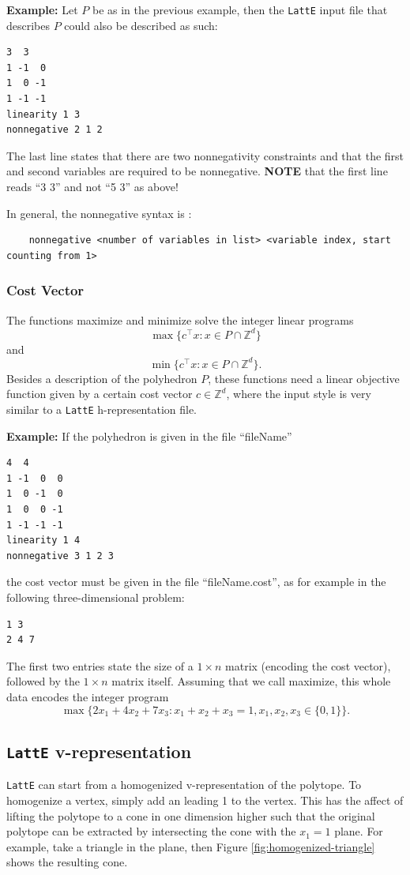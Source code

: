 \documentclass{article}
\newcommand{\Z}{{\mathbb Z}}
\newcommand{\latte}{{\tt LattE}\xspace}
\newcommand{\example}{{\bf Example:\space}}
\begin{document}
\example
Let $P$ be as in the previous example, then the {\tt LattE} input file
that describes $P$ could also be described as such: 
\begin{verbatim}
3  3
1 -1  0
1  0 -1
1 -1 -1
linearity 1 3
nonnegative 2 1 2
\end{verbatim}
The last line states that there are two nonnegativity constraints and
that the first and second variables are required to be nonnegative. 
{\bf NOTE} that the first line reads ``3 3'' and not ``5 3'' as above! 

In general, the nonnegative syntax is :
\begin{verbatim}
	nonnegative <number of variables in list> <variable index, start counting from 1>
\end{verbatim}


\subsubsection{Cost Vector}
The functions maximize and minimize solve the integer linear programs
\[
\max\{c^\intercal x: x\in P\cap\Z^d\}
\]
and
\[
\min\{c^\intercal x: x\in P\cap\Z^d\}.
\]
Besides a description of the polyhedron $P$, these functions need a
linear objective function given by a certain cost vector $c \in \Z^d$, where the input style is very similar to a \latte h-representation file. 

\example 
If the polyhedron is given in the file ``fileName''

\begin{verbatim}
4  4
1 -1  0  0
1  0 -1  0
1  0  0 -1
1 -1 -1 -1
linearity 1 4
nonnegative 3 1 2 3
\end{verbatim}
the cost vector must be given in the file ``fileName.cost'', as for
example in the following three-dimensional problem: 
\begin{verbatim}
1 3
2 4 7
\end{verbatim}
The first two entries state the size of a $1\times n$ matrix (encoding
the cost vector), followed by the $1\times n$ matrix itself. Assuming
that we call maximize, this whole data encodes the integer program
\[
\max\{2x_1+4x_2+7x_3: x_1+x_2+x_3=1, x_1,x_2,x_3\in\{0,1\}\}.
\]


\subsection{\latte v-representation}

\latte can start from a homogenized v-representation of the polytope. To homogenize a vertex, simply add an leading 1 to the vertex. This has the affect of lifting the polytope to a cone in one dimension higher such that the original polytope can be extracted by intersecting the cone with the $x_1 = 1$ plane. For example, take a triangle in the plane, then Figure \ref{fig:homogenized-triangle} shows the resulting cone.
\end{document}
